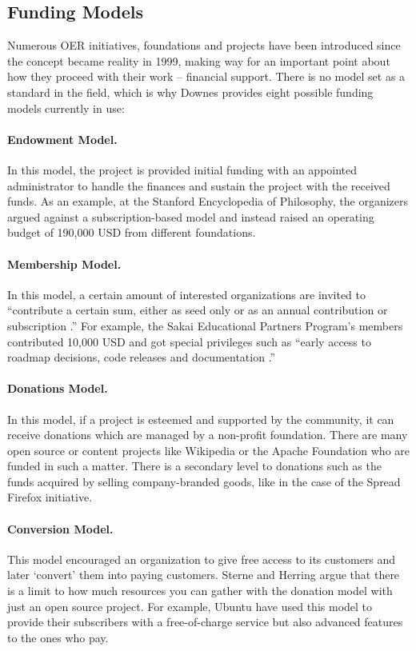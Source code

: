 \documentclass[a4paper]{article}
\begin{document}
\subsection{Funding Models} 
Numerous OER initiatives, foundations and projects have been introduced since the concept became reality in 1999, making way for an important point about how they proceed with their work -- financial support. There is no model set as a standard in the field, which is why Downes \cite{sustain} provides eight possible funding models currently in use: 

\paragraph{Endowment Model.} 
In this model, the project is provided initial funding with an appointed administrator to handle the finances and sustain the project with the received funds. As an example, at the Stanford Encyclopedia of Philosophy, the organizers argued against a subscription-based model and instead raised an operating budget of 190,000 USD from different foundations.

\paragraph{Membership Model.}
In this model, a certain amount of interested organizations are invited to ``contribute a certain sum, either as seed only or as an annual contribution or subscription \cite[p.34]{sustain}.'' For example, the Sakai Educational Partners Program's members contributed 10,000 USD and got special privileges such as ``early access to roadmap decisions, code releases and documentation \cite[p.34]{sustain}.''

\paragraph{Donations Model.}
In this model, if a project is esteemed and supported by the community, it can receive donations which are managed by a non-profit foundation. There are many open source or content projects like Wikipedia or the Apache Foundation who are funded in such a matter. There is a secondary level to donations such as the funds acquired by selling company-branded goods, like in the case of the Spread Firefox initiative.

\paragraph{Conversion Model.}
This model encouraged an organization to give free access to its customers and later `convert' them into paying customers. Sterne and Herring \cite{conversion} argue that there is a limit to how much resources you can gather with the donation model with just an open source project. For example, Ubuntu have used this model to provide their subscribers with a free-of-charge service but also advanced features to the ones who pay.
\end{document}
